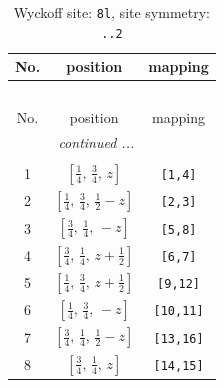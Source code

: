 \documentclass[fleqn,8pt]{jsarticle}
\begin{document}
\begin{longtable}{ccc}
\caption{Wyckoff site: {\tt 8l}, site symmetry: {\tt ..2}}
 \\
 \hline \hline
No. & position & mapping \\ \hline \endfirsthead

\multicolumn{2}{l}{\tablename\ \thetable{}} \\
 \hline \hline
No. & position & mapping \\ \hline \endhead

 \hline \hline
\multicolumn{2}{r}{\footnotesize\it continued ...} \\ \endfoot

 \hline \hline
\multicolumn{2}{r}{} \\ \endlastfoot

1 & $\left[ \frac{1}{4},\, \frac{3}{4},\, z \right]$ & {\tt [1,4]} \\ \hline
2 & $\left[ \frac{1}{4},\, \frac{3}{4},\, \frac{1}{2} - z \right]$ & {\tt [2,3]} \\ \hline
3 & $\left[ \frac{3}{4},\, \frac{1}{4},\, - z \right]$ & {\tt [5,8]} \\ \hline
4 & $\left[ \frac{3}{4},\, \frac{1}{4},\, z + \frac{1}{2} \right]$ & {\tt [6,7]} \\ \hline
5 & $\left[ \frac{1}{4},\, \frac{3}{4},\, z + \frac{1}{2} \right]$ & {\tt [9,12]} \\ \hline
6 & $\left[ \frac{1}{4},\, \frac{3}{4},\, - z \right]$ & {\tt [10,11]} \\ \hline
7 & $\left[ \frac{3}{4},\, \frac{1}{4},\, \frac{1}{2} - z \right]$ & {\tt [13,16]} \\ \hline
8 & $\left[ \frac{3}{4},\, \frac{1}{4},\, z \right]$ & {\tt [14,15]} \\
\end{longtable}
\renewcommand{\arraystretch}{1.2}
\end{document}

